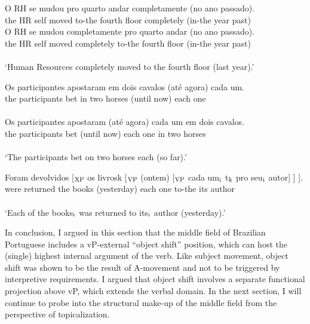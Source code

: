 \documentclass[output=paper]{langscibook}
\begin{document}
\begin{exe}
\ex \label{lacerda15}
\begin{xlist}
\ex \label{lacerda15a}
\gll O 	RH 	se 	mudou 	pro 	quarto	andar 	completamente	(no 	ano 	passado).\\
the 	HR 	self	moved	to-the	fourth	floor	completely 	(in-the	year	past)\\


\ex \label{lacerda15b}
\gll O 	RH 	se 	mudou 	completamente 	pro 	quarto	andar 	(no 	ano 	passado).\\
the 	HR 	self	moved	completely	to-the	fourth	floor	(in-the	year	past)\\\\
‘Human Resources completely moved to the fourth floor (last year).’\\
\end{xlist}

\ex \label{lacerda16}
\begin{xlist}
\ex \label{lacerda16a}
\gll Os 	participantes 	apostaram 	em 	dois 	cavalos 	(até 	agora) 	cada 	um.\\
the	participants	bet	in	two	horses	(until	now)	each	one\\\\

\ex \label{lacerda16b}
\gll Os 	participantes 	apostaram 	(até 	agora) 	cada 	um	em 	dois 	cavalos.\\
the	participants	bet	(until	now)	each	one	in	two	horses\\\\
‘The participants bet on two horses each (so far).’\\
\end{xlist}

\ex \label{lacerda17}
\gll Foram 	devolvidos [$_{\textnormal{XP}}$ os 	livrosk [$_{\textnormal{VP}}$ (ontem) 	[$_{\textnormal{VP}}$ cada 	um$_{\textnormal{i}}$ t$_{\textnormal{k}}$	pro 	seu$_{\textnormal{i}}$ 	autor] ] ].\\
were returned 	{}	the 	books 	{}	(yesterday) {}	each one {}	to-the	its 	author\\\\
‘Each of the books$_{\textnormal{i}}$ was returned to its$_{\textnormal{i}}$ author (yesterday).’
\end{exe}

In conclusion, I argued in this section that the middle field of Brazilian Portuguese includes a vP-external “object shift” position, which can host the (single) highest internal argument of the verb. Like subject movement, object shift was shown to be the result of A-movement and not to be triggered by interpretive requirements. I argued that object shift involves a separate functional projection above vP, which extends the verbal domain. In the next section, I will continue to probe into the structural make-up of the middle field from the perspective of topicalization.
\end{document}
